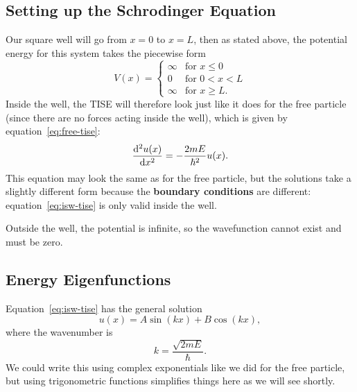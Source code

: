 \documentclass[../quantum_mechanics.tex]{subfiles}
\begin{document}
        \subsection{Setting up the Schrodinger Equation}\label{sec:infinite-square-well:subsec:setting-up-the-schrodinger-equation}
            Our square well will go from $x=0$ to $x=L$, then as stated above, the potential energy for this system takes the piecewise form
            \begin{equation}
                V(x)=\begin{cases}
                    \infty & \text{for }x\leq 0\\
                    0 & \text{for }0<x<L\\
                    \infty & \text{for }x\geq L.
                \end{cases}
            \end{equation}
            Inside the well, the TISE will therefore look just like it does for the free particle (since there are no forces acting inside the well), which is given by equation~\ref{eq:free-tise}:
            \begin{equation}\label{eq:isw-tise}
                \dv[2]{u(x)}{x}=-\frac{2mE}{\hbar^2}u(x).
            \end{equation}
            This equation may look the same as for the free particle, but the solutions take a slightly different form because the \textbf{boundary conditions} are different: equation~\ref{eq:isw-tise} is only valid inside the well.

            Outside the well, the potential is infinite, so the wavefunction cannot exist and must be zero.

        \subsection{Energy Eigenfunctions}\label{sec:infinite-square-well:subsec:energy-eigenfunctions}
            Equation~\ref{eq:isw-tise} has the general solution
            \begin{equation}
                u(x)=A\sin(kx)+B\cos(kx),
            \end{equation}
            where the wavenumber is
            \begin{equation}\label{eq:isw-wavenumber}
                k=\frac{\sqrt{2mE}}{\hbar}.
            \end{equation}
            We could write this using complex exponentials like we did for the free particle, but using trigonometric functions simplifies things here as we will see shortly.
\end{document}
